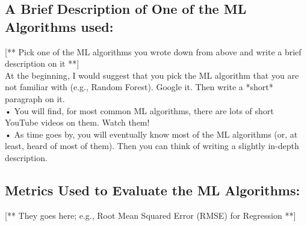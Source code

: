 \documentclass[]{article}
\begin{document}
\subsection*{A Brief Description of One of the ML Algorithms used:}
[** Pick one of the ML algorithms you wrote down from above and write a brief description on it **] \\
At the beginning, I would suggest that you pick the ML algorithm that you are not familiar with (e.g., Random Forest). Google it. Then write a *short* paragraph on it. \\
• You will find, for most common ML algorithms, there are lots of short YouTube videos on them. Watch them! \\
• As time goes by, you will eventually know most of the ML algorithms (or, at least, heard of most of them). Then you can think of writing a slightly in-depth description. 

\subsection*{Metrics Used to Evaluate the ML Algorithms:}
[** They goes here; e.g., Root Mean Squared Error (RMSE) for Regression **]
\end{document}
